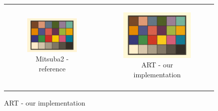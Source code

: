 \renewcommand\thesubfigure{\arabic{subfigure}}
\begin{figure}[h]
	\centering
	\begin{tabular}{cc}
		\begin{subfigure}
			{0.4\textwidth}\centering\includegraphics[width=\linewidth]{img/macbeth_chart_D50.png}
			\caption{Mitsuba2 - reference}
		\end{subfigure}
		&
		\begin{subfigure}
			{0.4\textwidth}\centering\includegraphics[width=\linewidth]{img/macbeth_chart_D50_ART.png}
			\caption{ART - our implementation}
		\end{subfigure} \\
		\begin{subfigure}

\end{subfigure}
\end{tabular}
\end{figure}

